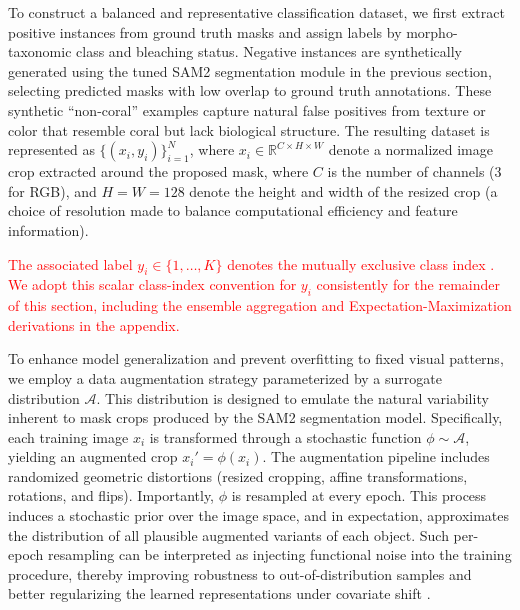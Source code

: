 \documentclass[11pt]{elsarticle}
\newcommand{\revadd}[1]{\textcolor{red}{#1}}
\newcommand{\revdel}[1]{%
  \sbox\revdelbox{#1}%
  \makebox[0pt][l]{\raisebox{0.45ex}{\rule{\wd\revdelbox}{0.4pt}}}\usebox\revdelbox
}
\begin{document}
To construct a balanced and representative classification dataset, we first extract positive instances from ground truth masks and assign labels by morpho-taxonomic class and bleaching status. Negative instances are synthetically generated using the tuned SAM2 segmentation module in the previous section, selecting predicted masks with low overlap to ground truth annotations. These synthetic ``non-coral'' examples capture natural false positives from texture or color that resemble coral but lack biological structure. The resulting dataset is represented as $\{(x_i, y_i)\}_{i=1}^N$, where $x_i \in \mathbb{R}^{C \times H \times W}$ denote a normalized image crop extracted around the proposed mask, where $C$ is the number of channels ($3$ for RGB), and $H = W = 128$ denote the height and width of the resized crop (a choice of resolution made to balance computational efficiency and feature information).

\revadd{The associated label $y_i \in \{1, \ldots, K\}$ denotes the mutually exclusive class index\revdel{ of mask $m_i$}. We adopt this scalar class-index convention for $y_i$ consistently for the remainder of this section, including the ensemble aggregation and Expectation-Maximization derivations in the appendix.}

To enhance model generalization and prevent overfitting to fixed visual patterns, we employ a data augmentation strategy parameterized by a surrogate distribution $\mathcal{A}$. This distribution is designed to emulate the natural variability inherent to mask crops produced by the SAM2 segmentation model. Specifically, each training image $x_i$ is transformed through a stochastic function $\phi \sim \mathcal{A}$, yielding an augmented crop $x_i' = \phi(x_i)$. The augmentation pipeline includes randomized geometric distortions (resized cropping, affine transformations, rotations, and flips). Importantly, $\phi$ is resampled at every epoch. This process induces a stochastic prior over the image space, and in expectation, approximates the distribution of all plausible augmented variants of each object. Such per-epoch resampling can be interpreted as injecting functional noise into the training procedure, thereby improving robustness to out-of-distribution samples and better regularizing the learned representations under covariate shift \citep{chapelle2001vicinal, zhang2018mixup, cubuk2019autoaugment}.
\end{document}
